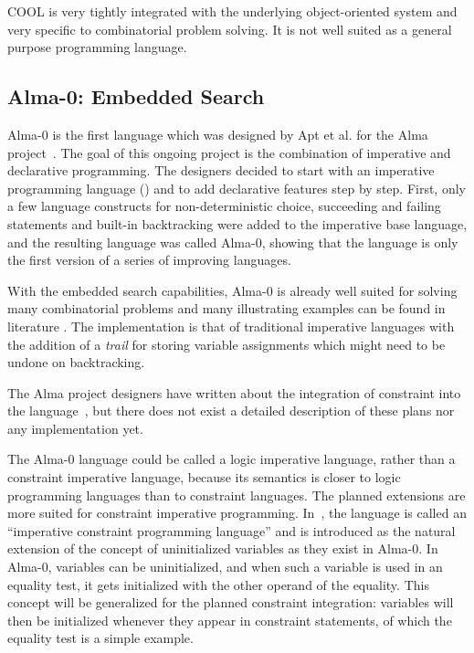 COOL is very tightly integrated with the underlying object-oriented
system and very specific to combinatorial problem solving.  It is not
well suited as a general purpose programming language.

\subsection{Alma-0: Embedded Search}

Alma-0 is the first language which was designed by Apt et al. for the
Alma project~\cite{apt98almaproject}.  The goal of this ongoing
project is the combination of imperative and declarative programming.
The designers decided to start with an imperative programming language
(\modula) and to add declarative features step by step.  First, only a
few language constructs for non-deterministic choice, succeeding and
failing statements and built-in backtracking were added to the
imperative base language, and the resulting language was called
Alma-0, showing that the language is only the first version of a
series of improving languages.

%
With the embedded search capabilities, Alma-0 is already well suited
for solving many combinatorial problems and many illustrating examples
can be found in literature \cite{apt97search, apt98alma}.  The
implementation is that of traditional imperative languages with the
addition of a {\em trail} for storing variable assignments which might
need to be undone on backtracking.

The Alma project designers have written about the integration of
constraint into the language~\cite{apt98almaproject}, but there does
not exist a detailed description of these plans nor any implementation
yet.

The Alma-0 language could be called a logic imperative language,
rather than a constraint imperative language, because its semantics is
closer to logic programming languages than to constraint languages.
The planned extensions are more suited for constraint imperative
programming.  In~\cite{apt98almaproject}, the language is called an
``imperative constraint programming language'' and is introduced as
the natural extension of the concept of uninitialized variables as
they exist in Alma-0.  In Alma-0, variables can be uninitialized, and
when such a variable is used in an equality test, it gets initialized
with the other operand of the equality.  This concept will be
generalized for the planned constraint integration: variables will
then be initialized whenever they appear in constraint statements, of
which the equality test is a simple example.

